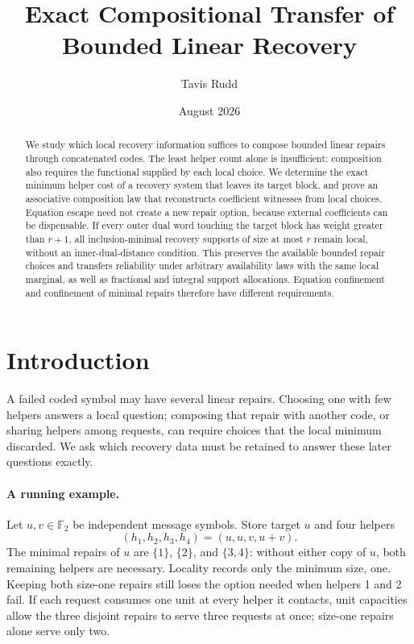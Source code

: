 \documentclass[11pt]{article}
\title{Exact Compositional Transfer of Bounded Linear Recovery}
\author{Tavis Rudd}
\date{August 2026}
\theoremstyle{definition}
\newcommand{\F}{\mathbb F}
\begin{document}
\maketitle

\begin{abstract}
We study which local recovery information suffices to compose bounded linear
repairs through concatenated codes.  The least helper count alone is insufficient:
composition also requires the functional supplied by each local choice.  We
determine the exact minimum helper cost of a recovery system that leaves its
target block, and prove an associative composition law that reconstructs
coefficient witnesses from local choices.  Equation escape need not create a
new repair option, because external coefficients can be dispensable.  If every
outer dual word touching the target block has weight greater than $r+1$, all
inclusion-minimal recovery supports of size at most $r$ remain local, without
an inner-dual-distance condition.  This preserves the available bounded repair
choices and transfers reliability under arbitrary availability laws with the
same local marginal, as well as fractional and integral support allocations.
Equation confinement and confinement of minimal repairs therefore have different
requirements.
\end{abstract}

\section{Introduction}

A failed coded symbol may have several linear repairs.  Choosing one with
few helpers answers a local question; composing that repair with another
code, or sharing helpers among requests, can require choices that the local
minimum discarded.  We ask which recovery data must be retained to answer
these later questions exactly.

\paragraph{A running example.}
\label{ex:running-recovery}
Let $u,v\in\F_2$ be independent message symbols.  Store target $u$ and four
helpers
\[
 (h_1,h_2,h_3,h_4)=(u,u,v,u+v).
\]
The minimal repairs of $u$ are $\{1\}$, $\{2\}$, and $\{3,4\}$: without
either copy of $u$, both remaining helpers are necessary.  Locality records
only the minimum size, one.  Keeping both size-one repairs still loses the
option needed when helpers 1 and 2 fail.  If each request consumes one unit at every helper it contacts, unit
capacities allow the three disjoint repairs to serve three requests at once;
size-one repairs alone serve only two.
\end{document}
